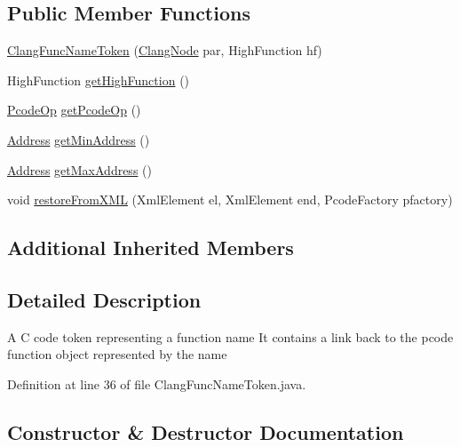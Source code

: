\subsection*{Public Member Functions}
\begin{DoxyCompactItemize}
\item 
\mbox{\hyperlink{classghidra_1_1app_1_1decompiler_1_1_clang_func_name_token_a2d38629cded0ebccc1e02c47fab5cccd}{Clang\+Func\+Name\+Token}} (\mbox{\hyperlink{interfaceghidra_1_1app_1_1decompiler_1_1_clang_node}{Clang\+Node}} par, High\+Function hf)
\item 
High\+Function \mbox{\hyperlink{classghidra_1_1app_1_1decompiler_1_1_clang_func_name_token_ab33ddfc24363949886b22462187de7d0}{get\+High\+Function}} ()
\item 
\mbox{\hyperlink{class_pcode_op}{Pcode\+Op}} \mbox{\hyperlink{classghidra_1_1app_1_1decompiler_1_1_clang_func_name_token_a1ad70f0e4af3cac359c3a77fbfda3c58}{get\+Pcode\+Op}} ()
\item 
\mbox{\hyperlink{class_address}{Address}} \mbox{\hyperlink{classghidra_1_1app_1_1decompiler_1_1_clang_func_name_token_a61430467edbd9abc0f53efa04608afbf}{get\+Min\+Address}} ()
\item 
\mbox{\hyperlink{class_address}{Address}} \mbox{\hyperlink{classghidra_1_1app_1_1decompiler_1_1_clang_func_name_token_a9678bd16bf55a5da6fd12eb93488c84e}{get\+Max\+Address}} ()
\item 
void \mbox{\hyperlink{classghidra_1_1app_1_1decompiler_1_1_clang_func_name_token_a08018f62d0ccf7f7df70fd4d589f9520}{restore\+From\+X\+ML}} (Xml\+Element el, Xml\+Element end, Pcode\+Factory pfactory)
\end{DoxyCompactItemize}
\subsection*{Additional Inherited Members}


\subsection{Detailed Description}
A C code token representing a function name It contains a link back to the pcode function object represented by the name 

Definition at line 36 of file Clang\+Func\+Name\+Token.\+java.



\subsection{Constructor \& Destructor Documentation}
\mbox{\label{classghidra_1_1app_1_1decompiler_1_1_clang_func_name_token_a2d38629cded0ebccc1e02c47fab5cccd}} 
